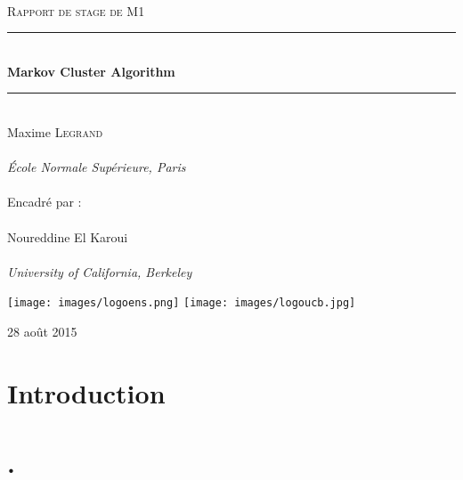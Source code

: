 \documentclass[12pt,a4paper]{report}
\newcommand{\HRule}{\rule{\linewidth}{0.5mm}}
\begin{document}

\begin{titlepage}
\begin{center}

~\\[1.5cm]
\textsc{\Large Rapport de stage de M1}\\[0.5cm]

\HRule \\[0.4cm]
{ \huge \bfseries Markov Cluster Algorithm\\[0.4cm] }

\HRule \\[1.5cm]

{\large Maxime \textsc{Legrand}}\\
~\\
{\large \emph{École Normale Supérieure, Paris}}\\
~\\[1cm]
{\large Encadré par :}\\
~\\
{\large Noureddine El Karoui}\\
~\\
{\large \emph{University of California, Berkeley}}\\

\vfill

\texttt{[image: images/logoens.png]} \hspace{2.5cm}
\texttt{[image: images/logoucb.jpg]}~\\

\vfill

{\large 28 août 2015}
\end{center}
\end{titlepage}

\tableofcontents

\newpage

\chapter*{Introduction}

\chapter*{\thechapter . }

\section{}
\end{document}
